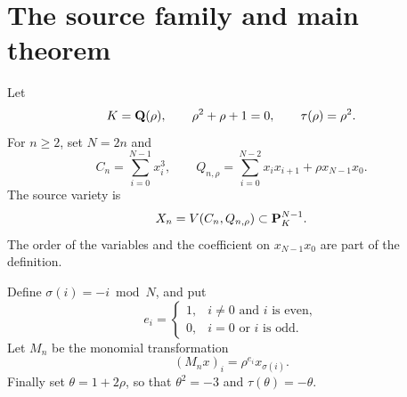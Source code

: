 \section{The source family and main theorem}
\label{sec:source-main}

Let
\[
K=\mathbf Q(\rho),\qquad \rho^2+\rho+1=0,\qquad
\tau(\rho)=\rho^2.
\]
For \(n\ge2\), set \(N=2n\) and
\begin{equation}
C_n=\sum_{i=0}^{N-1}x_i^3,\qquad
Q_{n,\rho}=\sum_{i=0}^{N-2}x_ix_{i+1}+\rho x_{N-1}x_0.
\label{eq:source-forms}
\end{equation}
The source variety is
\[
X_n=V(C_n,Q_{n,\rho})\subset\mathbf P_K^{N-1}.
\]
The order of the variables and the coefficient on \(x_{N-1}x_0\) are
part of the definition.

Define \(\sigma(i)=-i\bmod N\), and put
\[
e_i=\begin{cases}
1,&i\ne0\text{ and }i\text{ is even},\\
0,&i=0\text{ or }i\text{ is odd}.
\end{cases}
\]
Let \(M_n\) be the monomial transformation
\begin{equation}
(M_nx)_i=\rho^{e_i}x_{\sigma(i)}.
\label{eq:M-definition}
\end{equation}
Finally set \(\theta=1+2\rho\), so that \(\theta^2=-3\) and
\(\tau(\theta)=-\theta\).

